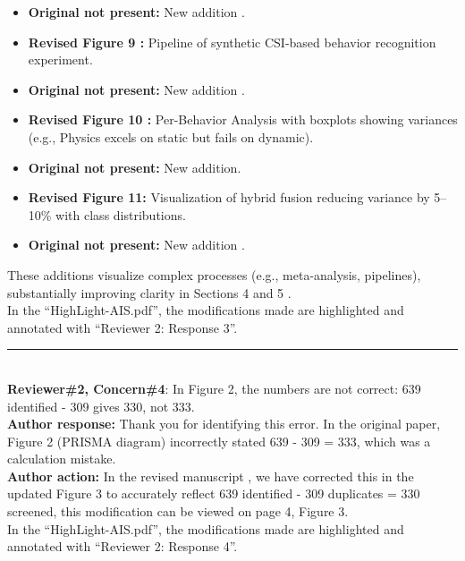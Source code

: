 \documentclass[Afour,sageh,times]{sagej}
\begin{document}
\begin{itemize}
    \item \textbf{Original not present:} New addition .  \\
    \item \textbf{Revised Figure 9 :} Pipeline of synthetic CSI-based behavior recognition experiment.  
    \item \textbf{Original not present:} New addition .\\
    \item \textbf{Revised Figure 10 :} Per-Behavior Analysis with boxplots showing variances (e.g., Physics excels on static but fails on dynamic).  
    \item \textbf{Original not present:} New addition.\\
    \item \textbf{Revised Figure 11:} Visualization of hybrid fusion reducing variance by 5–10\% with class distributions.  
    \item \textbf{Original not present:} New addition .  
\end{itemize}  
These additions visualize complex processes (e.g., meta-analysis, pipelines), substantially improving clarity in Sections 4 and 5 .\\

\textcolor{myOrange}{
In the “HighLight-AIS.pdf”, the modifications made are highlighted and annotated with “Reviewer 2: Response 3”.  
}\\

\color{gray}\rule{\linewidth}{1pt}\normalcolor\\

\textcolor{myGreen}{ \textbf{Reviewer\#2, Concern\#4}: In Figure 2, the numbers are not correct: 639 identified - 309 gives 330, not 333.}  \\
 
\textbf{Author response:} Thank you for identifying this error. In the original paper, Figure 2 (PRISMA diagram) incorrectly stated 639 - 309 = 333, which was a calculation mistake.\\
\textbf{Author action:} In the revised manuscript , we have corrected this in the updated Figure 3 to accurately reflect 639 identified - 309 duplicates = 330 screened, this modification can be viewed on page 4, Figure 3.\\

\textcolor{myOrange}{
In the “HighLight-AIS.pdf”, the modifications made are highlighted and annotated with “Reviewer 2: Response 4”.  }\\
\end{document}
